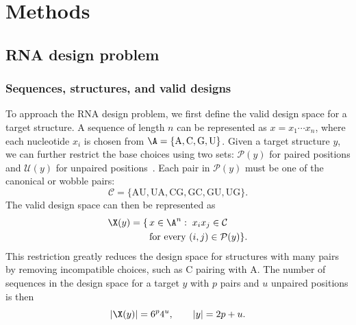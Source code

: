 \section{\textcolor{titleblue}{Methods}}
\subsection{RNA design problem}
\subsubsection{Sequences, structures, and valid designs}
To approach the RNA design problem, we first define the valid design space
for a target structure. A sequence of length $n$ can be represented as
$x=x_1\cdots x_n$, where each nucleotide $x_i$ is chosen from $\A=\{\mathrm{A,C,G,U}\}$. Given a target structure
$y$, we can further restrict the base choices using two sets:
$\mathcal{P}(y)$ for paired positions and $\mathcal{U}(y)$ for unpaired positions~\citep{tang2026}. Each pair in $\mathcal{P}(y)$
must be one of the canonical or wobble pairs:
\begin{equation}
 \mathcal{C}=\{\mathrm{AU,UA,CG,GC,GU,UG}\}.
\end{equation}
The valid design space can then be represented as
\begin{equation}
 \begin{split}
 \X(y)=\{\,&x\in\A^n:\;x_ix_j\in\mathcal{C}\\
 &\text{for every }(i,j)\in\mathcal{P}(y)\}.
 \end{split}
 \label{eq:validspace}
\end{equation}
This restriction greatly reduces the design space for structures with many pairs by
removing incompatible choices, such as C pairing with A. The number of sequences
in the design space for a target $y$ with $p$ pairs and $u$
unpaired positions is then
\begin{equation}
 |\X(y)|=6^p4^u,\qquad |y|=2p+u.
\end{equation}

